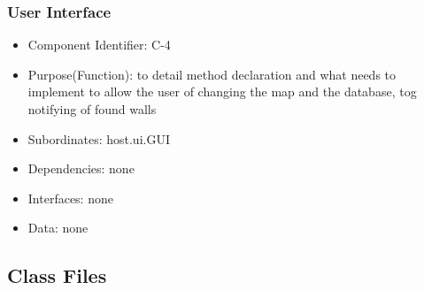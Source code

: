 \documentclass[11pt, a4paper]{report}
\begin{document}
\subsubsection{User Interface}
\begin{itemize}
\item Component Identifier: C-4
\item Purpose(Function): to detail method declaration and what needs to implement
 to allow the user of changing the map and the database, tog notifying of found walls
\item Subordinates: host.ui.GUI
\item Dependencies: none
\item Interfaces: none
\item Data: none
\end{itemize}
\subsection{Class Files}
\end{document}
